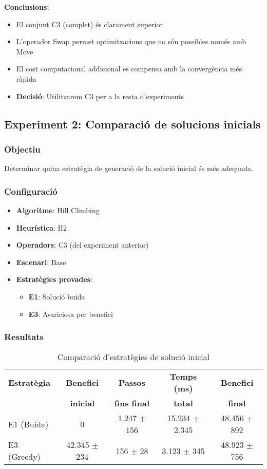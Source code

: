 \textbf{Conclusions:}
\begin{itemize}
    \item El conjunt C3 (complet) és clarament superior
    \item L'operador Swap permet optimitzacions que no són possibles només amb Move
    \item El cost computacional addicional es compensa amb la convergència més ràpida
    \item \textbf{Decisió}: Utilitzarem C3 per a la resta d'experiments
\end{itemize}

\subsection{Experiment 2: Comparació de solucions inicials}

\subsubsection{Objectiu}
Determinar quina estratègia de generació de la solució inicial és més adequada.

\subsubsection{Configuració}
\begin{itemize}
    \item \textbf{Algoritme}: Hill Climbing
    \item \textbf{Heurística}: H2
    \item \textbf{Operadors}: C3 (del experiment anterior)
    \item \textbf{Escenari}: Base
    \item \textbf{Estratègies provades}:
    \begin{itemize}
        \item \textbf{E1}: Solució buida
        \item \textbf{E3}: Avariciosa per benefici
    \end{itemize}
\end{itemize}

\subsubsection{Resultats}

\begin{table}[H]
\centering
\begin{tabular}{@{}lcccc@{}}
\toprule
\textbf{Estratègia} & \textbf{Benefici} & \textbf{Passos} & \textbf{Temps (ms)} & \textbf{Benefici} \\
 & \textbf{inicial} & \textbf{fins final} & \textbf{total} & \textbf{final} \\
\midrule
E1 (Buida) & 0 & 1.247 $\pm$ 156 & 15.234 $\pm$ 2.345 & 48.456 $\pm$ 892 \\
E3 (Greedy) & 42.345 $\pm$ 234 & 156 $\pm$ 28 & 3.123 $\pm$ 345 & 48.923 $\pm$ 756 \\
\bottomrule
\end{tabular}
\caption{Comparació d'estratègies de solució inicial}
\label{tab:exp2-inicial}
\end{table}

